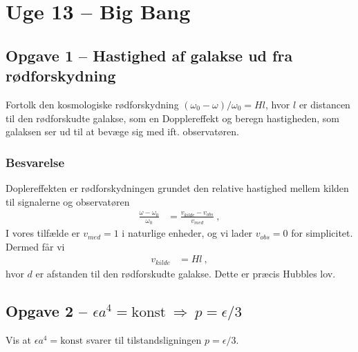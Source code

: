 \documentclass[../main.tex]{subfiles}
\begin{document}

\section{Uge 13 -- Big Bang}
\setcounter{section}{13}



\subsection{Opgave 1 -- Hastighed af galakse ud fra rødforskydning}
\setcounter{subsection}{1}
\setcounter{equation}{0}

Fortolk den kosmologiske rødforskydning $(\omega_0 - \omega)/\omega_0 = H l$, hvor $l$ er distancen til den rødforskudte galakse, som en Dopplereffekt og beregn hastigheden, som galaksen ser ud til at bevæge sig med ift. observatøren.


\subsubsection*{Besvarelse}

Doplereffekten er rødforskydningen grundet den relative hastighed mellem kilden til signalerne og observatøren
\begin{align}
    \frac{\omega - \omega_0}{\omega_0} &= \frac{v_{kilde} - v_{obs}}{v_{med}} \: ,
\end{align}
I vores tilfælde er $v_{med} = 1$ i naturlige enheder, og vi lader $v_{obs} = 0$ for simplicitet. Dermed får vi
\begin{align}
    v_{kilde} &= H l \: ,
\end{align}
hvor $d$ er afstanden til den rødforskudte galakse. Dette er præcis Hubbles lov.




\subsection{Opgave 2 -- $\epsilon a^4 = \text{konst} \: \Rightarrow \: p = \epsilon/3$}
\setcounter{subsection}{2}
\setcounter{equation}{0}

Vis at $\epsilon a^4 = \text{konst}$ svarer til tilstandsligningen $p = \epsilon/3$.
\end{document}
